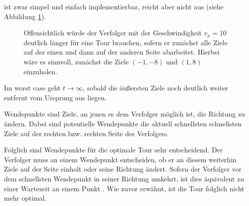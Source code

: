 \documentclass[german,version-2019-11]{uzl-thesis}
\begin{document}
ist zwar simpel und einfach implementierbar, reicht aber nicht aus (siehe Abbildung \ref{fig:GegenBsp1Dim}).
\begin{figure}[htbp]
\centering
{}
\caption{Offensichtlich würde der Verfolger mit der Geschwindigkeit $v_{\kappa}=10$ deutlich länger für eine Tour brauchen, sofern er zunächst alle Ziele auf der einen und dann auf der anderen Seite abarbeitet. Hierbei wäre es sinnvoll, zunächst die Ziele $(-1,-8)$ und $(1,8)$ einzuholen.}
\label{fig:GegenBsp1Dim}
\end{figure}
Im worst case geht $t\rightarrow\infty$, sobald die äußersten Ziele noch deutlich weiter entfernt vom Ursprung aus liegen. 
\begin{definition}
Wendepunkte sind Ziele, an jenen es dem Verfolger möglich ist, die Richtung zu ändern. Dabei sind potentielle Wendepunkte die aktuell  schnellsten schnellsten Ziele auf der rechten bzw. rechten Seite des Verfolgers.
\end{definition}
Folglich sind Wendepunkte für die optimale Tour sehr entscheidend. Der Verfolger muss an einem Wendepunkt entscheiden, ob er an diesem weiterhin Ziele auf der Seite einholt oder seine Richtung ändert. Sofern der Verfolger vor dem schnellsten Wendepunkt in seiner Richtung umkehrt, ist dies äquivalent zu einer Wartezeit an einem Punkt \cite{helvig}. Wie zuvor erwähnt, ist die Tour folglich nicht mehr optimal. 
\end{document}

